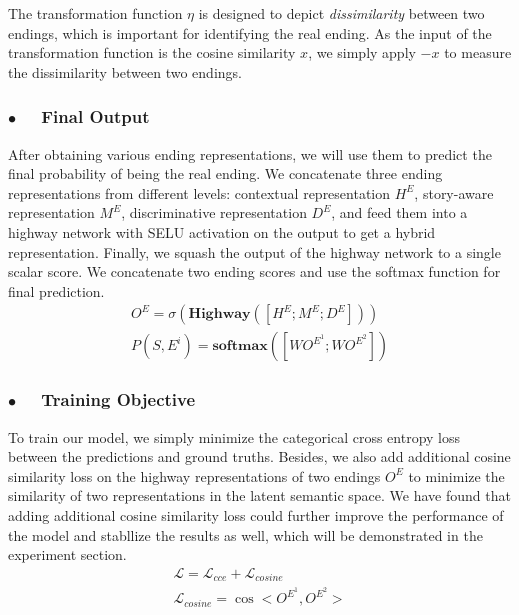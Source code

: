 \documentclass[letterpaper]{article} %
\begin{document}
The transformation function $\eta$ is designed to depict {\em dissimilarity} between two endings, which is important for identifying the real ending.
As the input of the transformation function is the cosine similarity $x$, we simply apply $-x$ to measure the dissimilarity between two endings.

\subsubsection*{$\bullet$~~ Final Output}
After obtaining various ending representations, we will use them to predict the final probability of being the real ending.
We concatenate three ending representations from different levels: contextual representation $H^E$, story-aware representation $M^E$, discriminative representation $D^E$, and feed them into a highway network \cite{srivastava-etal-2015} with SELU activation on the output to get a hybrid representation.
Finally, we squash the output of the highway network to a single scalar score. 
We concatenate two ending scores and use the softmax function for final prediction.
\begin{gather}
O^E =  \sigma(\mathbf{Highway}([H^E; M^E; D^E])) \\
P(S, E^i) = \mathbf{softmax}([W O^{E^{1}}; W O^{E^{2}}])
\end{gather}

\subsubsection*{$\bullet$~~ Training Objective}
To train our model, we simply minimize the categorical cross entropy loss between the predictions and ground truths.
Besides, we also add additional cosine similarity loss on the highway representations of two endings $O^E$ to minimize the similarity of two representations in the latent semantic space. We have found that adding additional cosine similarity loss could further improve the performance of the model and stabllize the results as well, which will be demonstrated in the experiment section.
\begin{gather}
\mathcal{L} = \mathcal{L}_{cce} + \mathcal{L}_{cosine} \\
\mathcal{L}_{cosine} = \cos<O^{E^{1}}, O^{E^{2}}>
\end{gather}
\end{document}
